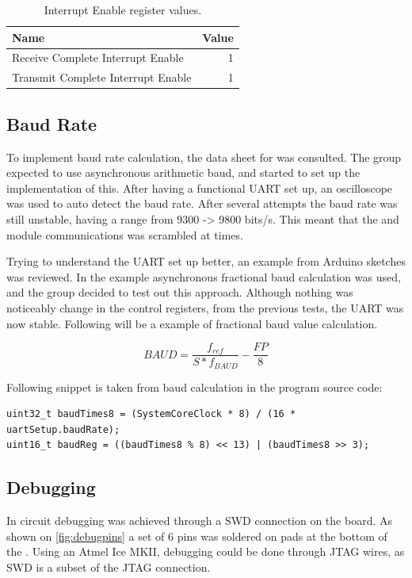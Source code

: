 \begin{table}[H]
	\begin{tabular}{lr}
		\toprule
		Name & Value \\
		\midrule
		Receive Complete Interrupt Enable & 1 \\ 
		Transmit Complete Interrupt Enable & 1 \\ 
		\bottomrule
	\end{tabular} 
	\centering
	\caption{Interrupt Enable register values.}
	\label{tab:UARTINTENSET}
\end{table}

\subsection{Baud Rate}
To implement baud rate calculation, the data sheet for \SAMD was consulted. The group expected to use asynchronous arithmetic baud, and started to set up the implementation of this. After having a functional UART set up, an oscilloscope was used to auto detect the baud rate. After several attempts the baud rate was still unstable, having a range from 9300 -> 9800 bits/s. This meant that the \GPS and \SARA module communications was scrambled at times.
 
Trying to understand the UART set up better, an example from Arduino sketches was reviewed. In the example asynchronous fractional baud calculation was used, and the group decided to test out this approach. Although nothing was noticeably change in the control registers, from the previous tests, the UART was now stable.
Following will be a example of fractional baud value calculation.

\[BAUD = \frac{f_{ref}}{S*f_{BAUD}} - \frac{FP}{8}\]

Following snippet is taken from baud calculation in the program source code:
\begin{verbatim}
uint32_t baudTimes8 = (SystemCoreClock * 8) / (16 * uartSetup.baudRate);
uint16_t baudReg = ((baudTimes8 % 8) << 13) | (baudTimes8 >> 3);	
\end{verbatim}

\subsection{Debugging}
In circuit debugging was achieved through a SWD connection on the \MKR board.
As shown on \cref{fig:debugpins} a set of 6 pins was soldered on pads at the bottom of the \MKR.
Using an Atmel Ice MKII, debugging could be done through JTAG wires, as SWD is a subset of the JTAG connection.

